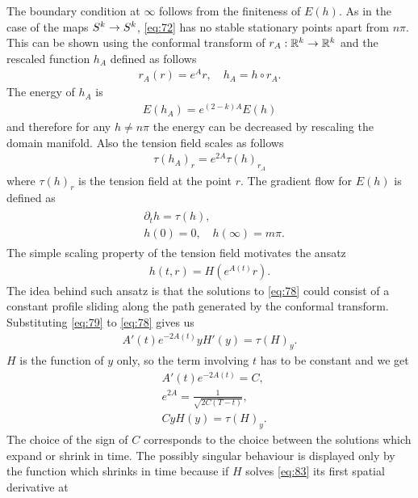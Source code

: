 The boundary condition at $\infty$ follows from the finiteness of
$E(h)$. As in the case of the maps $S^k\rightarrow S^k$, \eqref{eq:72} has no
stable stationary points apart from $n\pi$. This can be shown using
the conformal transform of $r_A:\mathbb{R}^k\rightarrow\mathbb{R}^k$ and the
rescaled function $h_A$ defined as follows
\begin{align}
  \label{eq:75}
  r_A(r)=e^A r,\quad h_A=h\circ r_A.
\end{align}
The energy of $h_A$ is
\begin{align}
  \label{eq:76}
  E(h_A)=e^{(2-k)A}E(h)
\end{align}
and therefore for any $h\ne n\pi$ the energy can be decreased by
rescaling the domain manifold. Also the tension field scales as
follows
\begin{align}
  \label{eq:77}
  \tau(h_A)_r=e^{2A}\tau(h)_{r_A}
\end{align}
where $\tau(h)_r$ is the tension field at the point $r$. The gradient
flow for $E(h)$ is defined as
\begin{align}
  \label{eq:78}
  \begin{split}
    &\partial_t h=\tau(h),\\
    &h(0)=0,\quad h(\infty)=m\pi.
  \end{split}
\end{align}
The simple scaling property of the tension field motivates the ansatz
\begin{align}
  \label{eq:79}
  h(t,r)=H(e^{A(t)}r).
\end{align}
The idea behind such ansatz is that the solutions to \eqref{eq:78}
could consist of a constant profile sliding along the path generated
by the conformal transform. Substituting \eqref{eq:79} to
\eqref{eq:78} gives us
\begin{align}
  \label{eq:80}
  A'(t)e^{-2A(t)}yH'(y)=\tau(H)_y.
\end{align}
$H$ is the function of $y$ only, so the term involving $t$ has to be
constant and we get
\begin{align}
  \label{eq:81}
  &A'(t)e^{-2A(t)}=C,\\
  \label{eq:82}
  &e^{2A}=\frac{1}{\sqrt{2C(T-t)}},\\
  \label{eq:83}
  &CyH(y)=\tau(H)_y.
\end{align}
The choice of the sign of $C$ corresponds to the choice between the
solutions which expand or shrink in time. The possibly singular
behaviour is displayed only by the function which shrinks in time
because if $H$ solves \eqref{eq:83} its first spatial derivative at
